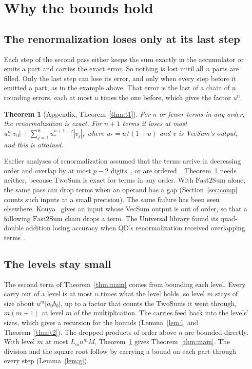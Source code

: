 \documentclass[conference]{IEEEtran}
\newtheorem{theorem}{Theorem}
\theoremstyle{definition}
\theoremstyle{remark}
\newcommand{\us}{u_{*}}
\newcommand{\TwoSum}{\mathrm{TwoSum}}
\newcommand{\FastTwoSum}{\mathrm{Fast2Sum}}
\begin{document}
\section{Why the bounds hold}

\subsection{The renormalization loses only at its last step} Each step of the second pass either keeps the sum exactly
in the accumulator or emits a part and carries the exact error. So nothing is lost until all $n$ parts are filled. Only
the last step can lose its error, and only when every step before it emitted a part, as in the example above. That
error is the last of a chain of $n$ rounding errors, each at most $u$ times the one before, which gives the factor
$u^n$.

\begin{theorem}[Appendix, Theorem~\ref{thm:t1}]\label{thm:renorm}
For $n$ or fewer terms in any order, the renormalization is exact. For $n + 1$ terms it loses at most
$\us^n|v_0| + \sum_{j=1}^{n}\us^{n+1-j}|v_j|$, where $\us = u/(1+u)$ and $v$ is VecSum's output, and this is
attained.
\end{theorem}

Earlier analyses of renormalization assumed that the terms arrive in decreasing order and overlap by at most $p - 2$
digits~\cite{JMMP16,BJMP17}, or are ordered~\cite{FMP19}. Theorem~\ref{thm:renorm} needs neither, because $\TwoSum$
is exact for terms in any order. With $\FastTwoSum$ alone, the same pass can drop terms when an operand has a gap
(Section~\ref{sec:comp} counts such inputs at a small precision). The same failure has been seen elsewhere. Kouya~\cite{Kouya26} gives an input whose VecSum
output is out of order, so that a following $\FastTwoSum$ chain drops a term. The Universal library found its
quad-double addition losing accuracy when QD's renormalization received overlapping terms~\cite{universal}.

\subsection{The levels stay small} The second term of Theorem~\ref{thm:main} comes from bounding each level. Every
carry out of a level is at most $u$ times what the level holds, so level $m$ stays of size about $u^m|a_0b_0|$, up to
a factor that counts the $\TwoSum$s it went through, $m(m+1)$ at level $m$ of the multiplication. The carries feed back
into the levels' sizes, which gives a recursion for the bounds (Lemma~\ref{lem:l} and Theorem~\ref{thm:t2}). The
dropped products of order above $n$ are bounded directly. With level $m$ at most $L_mu^mM$,
Theorem~\ref{thm:renorm} gives Theorem~\ref{thm:main}. The division and the square root follow by carrying a bound on
each part through every step (Lemma~\ref{lem:g}).
\end{document}
